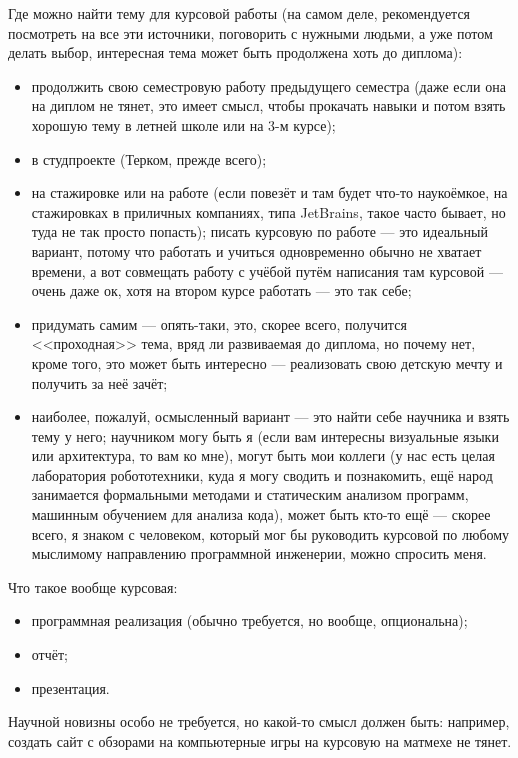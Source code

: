 \documentclass[a5paper]{article}
\begin{document}
Где можно найти тему для курсовой работы (на самом деле, рекомендуется посмотреть на все эти источники, поговорить с нужными людьми, а уже потом делать выбор, интересная тема может быть продолжена хоть до диплома):
\begin{itemize}
	\item продолжить свою семестровую работу предыдущего семестра (даже если она на диплом не тянет, это имеет смысл, чтобы прокачать навыки и потом взять хорошую тему в летней школе или на 3-м курсе);
	\item в студпроекте (Терком, прежде всего);
	\item на стажировке или на работе (если повезёт и там будет что-то наукоёмкое, на стажировках в приличных компаниях, типа JetBrains, такое часто бывает, но туда не так просто попасть); писать курсовую по работе --- это идеальный вариант, потому что работать и учиться одновременно обычно не хватает времени, а вот совмещать работу с учёбой путём написания там курсовой --- очень даже ок, хотя на втором курсе работать --- это так себе;
	\item придумать самим --- опять-таки, это, скорее всего, получится <<проходная>> тема, вряд ли развиваемая до диплома, но почему нет, кроме того, это может быть интересно --- реализовать свою детскую мечту и получить за неё зачёт;
	\item наиболее, пожалуй, осмысленный вариант --- это найти себе научника и взять тему у него; научником могу быть я (если вам интересны визуальные языки или архитектура, то вам ко мне), могут быть мои коллеги (у нас есть целая лаборатория робототехники, куда я могу сводить и познакомить, ещё народ занимается формальными методами и статическим анализом программ, машинным обучением для анализа кода), может быть кто-то ещё --- скорее всего, я знаком с человеком, который мог бы руководить курсовой по любому мыслимому направлению программной инженерии, можно спросить меня.
\end{itemize}

Что такое вообще курсовая:
\begin{itemize}
	\item программная реализация (обычно требуется, но вообще, опциональна);
	\item отчёт;
	\item презентация.
\end{itemize}

Научной новизны особо не требуется, но какой-то смысл должен быть: например, создать сайт с обзорами на компьютерные игры на курсовую на матмехе не тянет.
\end{document}
